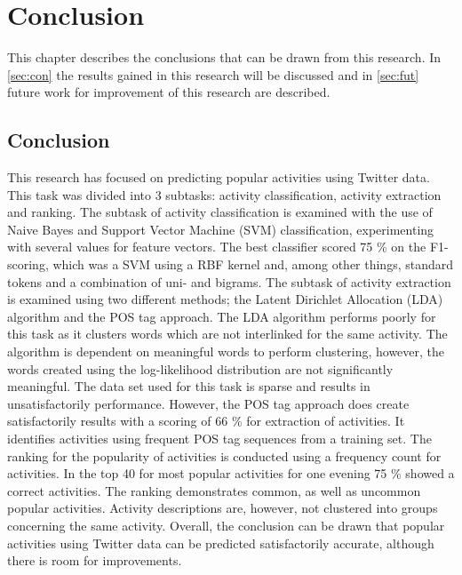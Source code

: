 \chapter{Conclusion} %
\label{ch:cncl} %
This chapter describes the conclusions that can be drawn from this research. In \autoref{sec:con} the results gained in this research will be discussed and in \autoref{sec:fut} future work for improvement of this research are described.
\iffalse
\section{Conclusion}\label{sec:con}
This research has focused on predicting popular activities using Twitter data. This task was divided into 3 subtasks: activity classification, activity extraction and ranking. The subtask of activity classification is examined with the use of Naive Bayes and Support Vector Machine (SVM) classification, experimenting with several values for feature vectors. The best classifier scored 75 \% on the F1-scoring, which was a SVM using a RBF kernel and, among other things, standard tokens and a combination of uni- and bigrams.
The subtask of activity extraction is examined using two different methods; the Latent Dirichlet Allocation (LDA) algorithm and the POS tag approach. The LDA algorithm performs poorly for this task as it clusters words which are not interlinked for the same activity. The algorithm is dependent on meaningful words to perform clustering, however, the words created using the log-likelihood distribution are not significantly meaningful. The data set used for this task is sparse and results in unsatisfactorily performance.
However, the POS tag approach does create satisfactorily results with a scoring of 66 \% for extraction of activities. It identifies activities using frequent POS tag sequences from a training set. 
The ranking for the popularity of activities is conducted using a frequency count for activities. In the top 40 for most popular activities for one evening 75 \% showed a correct activities. The ranking demonstrates common, as well as uncommon popular activities. Activity descriptions are, however, not clustered into groups concerning the same activity.
Overall, the conclusion can be drawn that popular activities using Twitter data can be predicted satisfactorily accurate, although there is room for improvements. 
